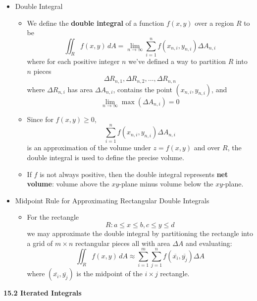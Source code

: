 \documentclass[12pt]{article}
\newcommand{\dvar}[1]{\,d{#1}}
\renewcommand{\d}[1]{\dvar{#1}}
\newcommand{\<}{\left<}
\renewcommand{\>}{\right>}
\begin{document}
  \begin{itemize}

  \item Double Integral
    \begin{itemize}
    \item We define the \textbf{double integral} of a function $f(x,y)$ over a region $R$ to be 
      \[
        \iint_R f(x,y)\d{A} = \lim_{n\to\infty}\sum_{i=1}^n f(x_{n,i},y_{n,i})\Delta A_{n,i}
      \]
    where for each positive integer $n$ we've defined a way to partition $R$ into $n$ pieces 
      \[
        \Delta R_{n,1},\Delta R_{n,2},\dots,\Delta R_{n,n}
      \]
    where $\Delta R_{n,i}$ has area $\Delta A_{n,i}$, contains the point $(x_{n,i},y_{n,i})$, and \[\lim_{n\to\infty} \max(\Delta A_{n,i}) = 0\]
    \item Since for $f(x,y)\geq 0$,
      \[
        \sum_{i=1}^n f(x_{n,i},y_{n,i})\Delta A_{n,i}
      \]
      is an approximation of the volume under $z=f(x,y)$ and over $R$, the double integral is used to define the precise volume.
    \item If $f$ is not always positive, then the double integral represents \textbf{net volume}: volume above the $xy$-plane minus volume below the $xy$-plane.
    \end{itemize}

  \item Midpoint Rule for Approximating Rectangular Double Integrals
    \begin{itemize}
      \item For the rectangle
      \[
        R: a\leq x\leq b, c\leq y\leq d
      \]
      we may approximate the double integral by partitioning the rectangle into a grid of $m\times n$ rectangular pieces all with area $\Delta A$ and evaluating:
      \[
        \iint_R f(x,y)\d{A} \approx \sum_{i=1}^m\sum_{j=1}^n f(\overline{x_i},\overline{y_j}) \Delta A
      \]
      where $(\overline{x_i},\overline{y_j})$ is the midpoint of the $i\times j$ rectangle.
    \end{itemize}

  \end{itemize}

\newpage

\centerline{\bf 15.2 Iterated Integrals}
\end{document}
